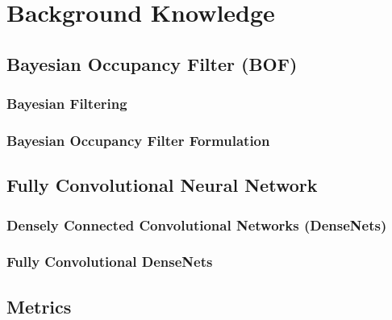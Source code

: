 \chapter{Background Knowledge}
%
\section{Bayesian Occupancy Filter (BOF)} 

\subsection{Bayesian Filtering}

\subsection{Bayesian Occupancy Filter Formulation}

\section{Fully Convolutional Neural Network}

\subsection{Densely Connected Convolutional Networks (DenseNets)}

\subsection{Fully Convolutional DenseNets}

\section{Metrics}